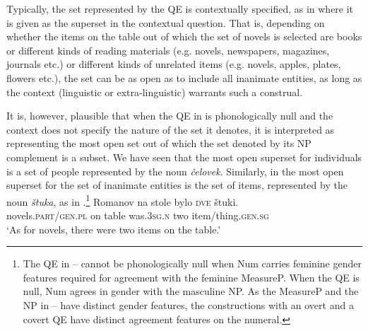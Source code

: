 \documentclass[output=paper,
modfonts,
newtxmath,
hidelinks
]{langscibook}
\begin{document}
\largerpage[2]
\noindent Typically, the set represented by the QE is contextually specified, as in  where it is given as the superset in the contextual question. That is, depending on whether the items on the table out of which the set of novels is selected are books or different kinds of reading materials (e.g. novels, newspapers, magazines, journals etc.) or different kinds of unrelated items (e.g. novels, apples, plates, flowers etc.), the set can be as open as to include all inanimate entities, as long as the context (linguistic or extra-linguistic) warrants such a construal.


\begin{exe}
\ex \label{ex32}
\begin{xlist}
\end{xlist}
\end{exe}

\noindent It is, however, plausible that when the QE in  is phonologically null and the context does not specify the nature of the set it denotes, it is interpreted as representing the most open set out of which the set denoted by its NP\textsubscript{} complement is a subset. We have seen that the most open superset for individuals is a set of people represented by the noun \textit{čelovek}. Similarly, in  the most open superset for the set of inanimate entities is the set of items, represented by the noun \textit{štuka}, as in .\footnote{\label{fn22}The QE in -- cannot be phonologically null when Num carries feminine gender features required for agreement with the feminine MeasureP. When the QE is null, Num agrees in gender with the masculine NP. As the MeasureP and the NP in -- have distinct gender features, the constructions with an overt and a covert QE have distinct agreement features on the numeral.
} 
\ea \label{ex33}
\gll Romanov  na   stole  bylo  \textsc{dve}  štuki.\\
     novels.\textsc{part/gen.pl} on table  was.\textsc{3sg.n}  two  item/thing.\textsc{gen.sg}\\
\glt  `As for novels, there were two items on the table.'
\z
\end{document}
